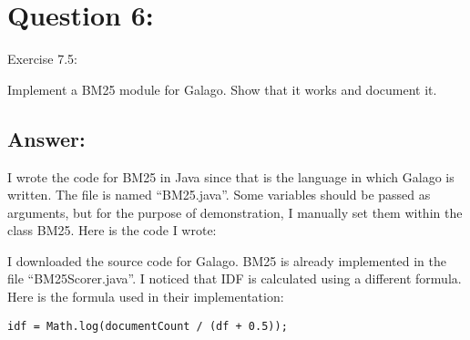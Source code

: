 \section*{Question 6:}
Exercise 7.5: 

Implement a BM25 module for Galago. Show that it works and document
it.

\subsection*{Answer:}

I wrote the code for BM25 in Java since that is the language in which Galago is written. The file is named ``BM25.java''. Some variables should be passed as arguments, but for the purpose of demonstration, I manually set them within the class BM25. Here is the code I wrote:



I downloaded the source code for Galago. BM25 is already implemented in the file ``BM25Scorer.java''. I noticed that IDF is calculated using a different formula. Here is the formula used in their implementation:

\begin{lstlisting}
idf = Math.log(documentCount / (df + 0.5)); 
\end{lstlisting}
